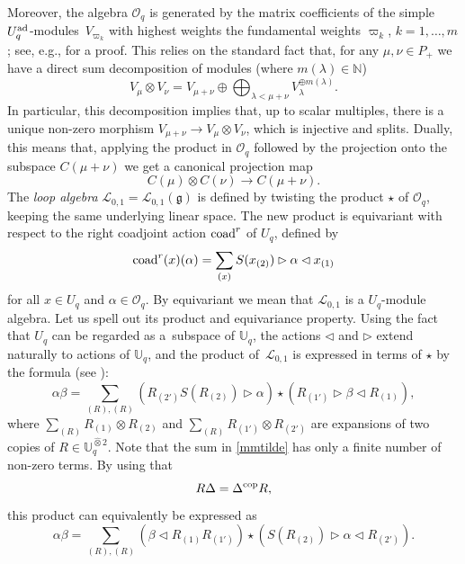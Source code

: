\documentclass[10pt,a4paper]{amsart}
\numberwithin{equation}{section}
\theoremstyle{definition}
\newcommand{\Oq}{\Oo_{q}}
\newcommand{\mUq}{\mathbb{U}_q}
\newcommand{\mn}{\mathbb{N}}
\newcommand{\Ll}{{\mathcal L}}
\newcommand{\Oo}{{\mathcal O}}
\newcommand{\ra}{\rightarrow}
\begin{document}
Moreover, the algebra $\Oo_q$ is generated by the matrix coefficients of the simple $U_q^{\rm ad}$-modules~$V_{\!\varpi_{\!k}}$ with highest weights the fundamental weights $\varpi_k$, $k=1,\dots,m$; see, e.g., \cite[Proposition~I.7.8]{BG} for a proof. This relies on the standard fact that, for any $\mu,\nu \in P_+$ we have a direct sum decomposition of modules (where $m(\lambda)\in \mn$)
\begin{equation}\label{decomprep}
V_\mu\otimes V_\nu = V_{\mu+\nu} \oplus \bigoplus_{\lambda < \mu+\nu} V_\lambda^{\oplus m(\lambda)}.
\end{equation}
In particular, this decomposition implies that, up to scalar multiples, there is a unique non-zero morphism $V_{\mu+\nu} \ra V_\mu\otimes V_\nu$, which is injective and splits. Dually, this means that, applying the product in $\Oo_q$ followed by the projection onto the subspace $C(\mu+\nu)$ we get a canonical projection map
\begin{equation}\label{projOq}
C(\mu)\otimes C(\nu) \ra C(\mu+\nu).
\end{equation}
The {\it loop algebra} $\Ll_{0,1} = \Ll_{0,1}(\mathfrak{g})$ is defined by twisting the product $\star$ of $\Oo_q$, keeping the same underlying linear space. The new product is equivariant with respect to the right coadjoint action ${\rm coad}^r$ of $U_q$, defined by
\[{\rm coad}^r(x)(\alpha) = \sum_{(x)}{S}(x_{(2)}) \rhd \alpha \lhd x_{(1)}\]
for all $x\in U_q$ and $\alpha\in \Oq$. By equivariant we mean that $\Ll_{0,1}$ is a $U_q$-module algebra. Let us spell out its product and equivariance property. Using the fact that $U_q$ can be regarded as a~subspace of $\mUq$, the actions $\lhd$ and $\rhd$ extend naturally to actions of $\mUq$, and the product of~$\Ll_{0,1}$ is expressed in terms of $\star$ by the formula (see \cite[Proposition 4.1]{BR}):
\begin{equation}\label{mmtilde}
\alpha\beta = \sum_{(R),(R)}(R_{(2')}{S}(R_{(2)}) \rhd \alpha) \star (R_{(1')}\rhd \beta \lhd R_{(1)}),
\end{equation}
where $ \sum_{(R)}R_{(1) }\otimes R_{(2)}$ and $\sum_{(R)}R_{(1') }\otimes R_{(2')}$ are expansions of two copies of $R\in \mUq^{\hat \otimes 2}$. Note that the sum in \eqref{mmtilde} has only a finite number of non-zero terms. By using that
\[R\Delta = \Delta^{\rm cop}R,\]
 this product can equivalently be expressed as
\begin{equation}\label{mmtildebis}
\alpha\beta = \sum_{(R),(R)}(\beta \lhd R_{(1)}R_{(1')}) \star (S(R_{(2)})\rhd \alpha \lhd R_{(2')}).
\end{equation}
\end{document}
